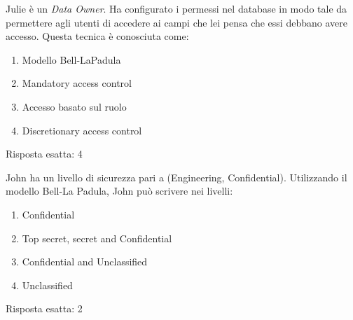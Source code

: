 
\begin{Exercise} [
  title={Domanda},
  label={pass3}
 ]

 \Question Julie è un \textit{Data Owner}. Ha configurato i permessi nel 
database in modo tale da permettere agli utenti di accedere ai campi che lei 
pensa che essi debbano avere accesso. Questa tecnica è conosciuta come:
\begin{enumerate}
 \item Modello Bell-LaPadula
 \item Mandatory access control
 \item Accesso basato sul ruolo
 \item Discretionary access control
\end{enumerate}


\end{Exercise}


\begin{Answer} [
  ref={pass3},
  number={3}
  ]

  \Question Risposta esatta: 4

\end{Answer}


\begin{Exercise} [
  title={Domanda},
  label={pass4}
 ]

 \Question John ha un livello di sicurezza pari a (Engineering, Confidential).
Utilizzando il modello Bell-La Padula, John può scrivere nei livelli:
\begin{enumerate}
\item Confidential
\item Top secret, secret and Confidential
\item Confidential and Unclassified
\item Unclassified
\end{enumerate}


\end{Exercise}

\begin{Answer} [
  ref={pass4},
  number={4}
  ]

  \Question Risposta esatta: 2

\end{Answer}
